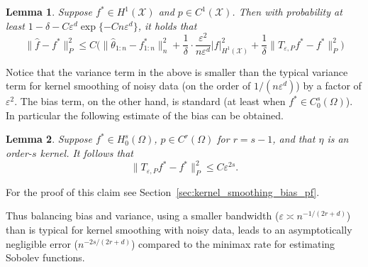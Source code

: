 \documentclass{article}
\newcommand{\1}{\mathbf{1}}
\newcommand{\mc}[1]{\mathcal{#1}}
\newcommand{\wh}[1]{\widehat{#1}}
\newtheorem{lemma}{Lemma}
\theoremstyle{definition}
\theoremstyle{remark}
\begin{document}
\begin{lemma}
	\label{lem:kernel_smoothing_laplacian_eigenmaps}
	Suppose $f^{\ast} \in H^1(\mc{X})$ and $p \in C^1(\mc{X})$. Then with probability at least $1 - \delta - C\varepsilon^d\exp\{-Cn\varepsilon^d\}$, it holds that
	\begin{equation*}
	\|\wh{f} - f^{\ast}\|_P^2 \leq C\biggl(\|\wh{\theta}_{1:n} - f^{\ast}_{1:n}\|_n^2 + \frac{1}{\delta} \cdot \frac{\varepsilon^2}{n\varepsilon^d} |f|_{H^1(\mc{X})}^2 + \frac{1}{\delta}\|T_{\varepsilon,P}f^{\ast} - f^{\ast}\|_P^2\biggr)
	\end{equation*}
\end{lemma}
Notice that the variance term in the above is smaller than the typical variance term for kernel smoothing of noisy data (on the order of $1/(n\varepsilon^d)$) by a factor of $\varepsilon^2$. The bias term, on the other hand, is standard (at least when $f^{\ast} \in C_0^s(\Omega)$). In particular the following estimate of the bias can be obtained. 
\begin{lemma}
	\label{lem:kernel_smoothing_bias}
	Suppose $f^{\ast} \in H_0^{s}(\Omega)$, $p \in C^{r}(\Omega)$ for $r = s - 1$, and that $\eta$ is an order-$s$ kernel. It follows that
	\begin{equation*}
	\|T_{\varepsilon,P}f^{\ast} - f^{\ast}\|_P^2 \leq C \varepsilon^{2s}.
	\end{equation*}
\end{lemma}
For the proof of this claim see Section~\ref{sec:kernel_smoothing_bias_pf}.

Thus balancing bias and variance, using a smaller bandwidth ($\varepsilon \asymp n^{-1/(2r + d)}$) than is typical for kernel smoothing with noisy data, leads to an asymptotically negligible error ($n^{-2s/(2r + d)}$) compared to the minimax rate for estimating Sobolev functions. 
\end{document}

